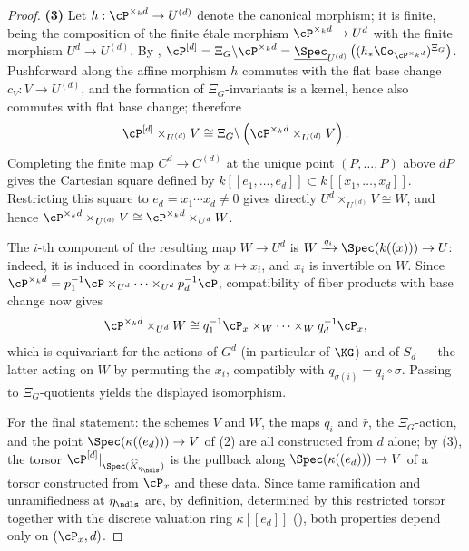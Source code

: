 \begin{proof}
    \textbf{(3)} Let $h : \cP^{\times_k d} \to U^{(d)}$ denote the canonical morphism; it is finite, being the composition
    of the finite étale morphism $\cP^{\times_k d} \to U^d$ with the finite morphism $U^d \to U^{(d)}$. By
    ,
    $\cP^{[d]} = \Xi_G \backslash \cP^{\times_k d} = \underline{\Spec}_{U^{(d)}}\left((h_* \Oo_{\cP^{\times_k d}})^{\Xi_G}\right)$.
    Pushforward along the affine morphism $h$ commutes with the flat base change $c_V : V \to U^{(d)}$, and the formation of
    $\Xi_G$-invariants is a kernel, hence also commutes with flat base change; therefore
    $$ \cP^{[d]} \times_{U^{(d)}} V \cong \Xi_G \backslash \left(\cP^{\times_k d} \times_{U^{(d)}} V\right).$$
    Completing the finite map $C^d\to C^{(d)}$ at the unique point
    $(P,\dots,P)$ above $dP$ gives the Cartesian square defined by
    $k[[e_1,\dots,e_d]]\subset k[[x_1,\dots,x_d]]$.  Restricting this square
    to $e_d=x_1\cdots x_d\ne0$ gives directly
    $U^d\times_{U^{(d)}}V\cong W$, and hence
    $\cP^{\times_k d}\times_{U^{(d)}}V
      \cong\cP^{\times_k d}\times_{U^d}W$.

    The $i$-th component of the resulting map $W\to U^d$ is
    $W\xrightarrow{q_i}\Spec(k((x)))\to U$: indeed, it is induced in
    coordinates by $x\mapsto x_i$, and $x_i$ is invertible on $W$.
    Since
    $\cP^{\times_k d}=p_1^{-1}\cP\times_{U^d}\cdots\times_{U^d}p_d^{-1}\cP$,
    compatibility of fiber products with base change now gives
    $$ \cP^{\times_k d} \times_{U^d} W \cong q_1^{-1}\cP_x \times_W \cdots \times_W q_d^{-1}\cP_x, $$
    which is equivariant for the actions of $G^d$ (in particular of $\KG$) and of $S_d$ --- the latter acting on $W$ by
    permuting the $x_i$, compatibly with $q_{\sigma(i)} = q_i \circ \sigma$. Passing to $\Xi_G$-quotients yields the displayed
    isomorphism.

    For the final statement: the schemes $V$ and $W$, the maps $q_i$ and $\hat{r}$, the $\Xi_G$-action, and the point
    $\Spec(\kappa((e_d))) \to V$ of (2) are all constructed from $d$ alone; by (3), the torsor
    $\cP^{[d]}|_{\Spec(\widehat{K}_{\eta_\ndls})}$ is the pullback along $\Spec(\kappa((e_d))) \to V$ of a torsor constructed
    from $\cP_x$ and these data. Since tame ramification and unramifiedness at
    $\eta_\ndls$ are, by definition, determined by this restricted torsor
    together with the discrete valuation ring $\kappa[[e_d]]$
    (), both properties depend only
    on $(\cP_x,d)$.
\end{proof}

